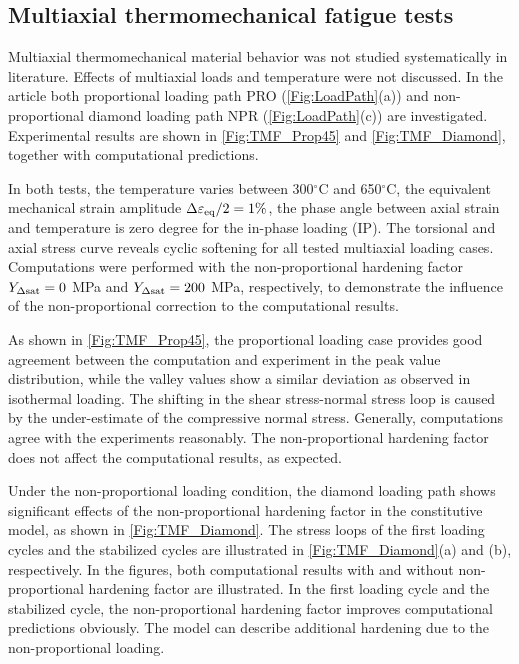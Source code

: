 \subsection{Multiaxial thermomechanical fatigue tests}
\noindent
Multiaxial thermomechanical material behavior was not studied systematically in literature. Effects of multiaxial loads and temperature were not discussed. In the article both proportional loading path PRO (\ref{Fig:LoadPath}(a)) and non-proportional diamond loading path NPR (\ref{Fig:LoadPath}(c)) are investigated. Experimental results are shown in \ref{Fig:TMF_Prop45} and \ref{Fig:TMF_Diamond}, together with computational predictions.

In both tests, the temperature varies between 300$^\circ$C and 650$^\circ$C, the equivalent mechanical strain amplitude $\Delta\varepsilon_{\rm{eq}}/2=1\%$, the phase angle between axial strain and temperature is zero degree for the in-phase loading (IP).
The torsional and axial stress curve reveals cyclic softening for all tested multiaxial loading cases.
Computations were performed with the non-proportional hardening factor $Y_{\Delta {\rm{sat}}}=0$ MPa and $Y_{\Delta {\rm{sat}}}=200$ MPa, respectively, to demonstrate the influence of the non-proportional correction to the computational results.

As shown in \ref{Fig:TMF_Prop45}, the proportional loading case provides good agreement between the computation and experiment in the peak value distribution, while the valley values show a similar deviation as observed in isothermal loading. The shifting in the shear stress-normal stress loop is caused by the under-estimate of the compressive normal stress. Generally, computations agree with the experiments reasonably. The non-proportional hardening factor does not affect the computational results, as expected.

Under the non-proportional loading condition, the diamond loading path shows significant effects of the non-proportional hardening factor in the constitutive model, as shown in \ref{Fig:TMF_Diamond}. The stress loops of the first loading cycles and the stabilized cycles are illustrated in \ref{Fig:TMF_Diamond}(a) and (b), respectively. In the figures, both computational results with and without non-proportional hardening factor are illustrated. In the first loading cycle and the stabilized cycle, the non-proportional hardening factor improves computational predictions obviously. The model can describe additional hardening due to the non-proportional loading.

